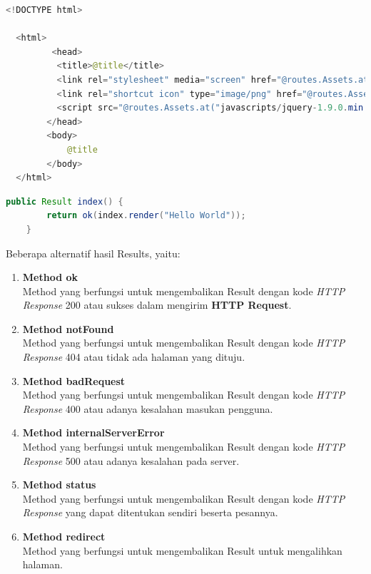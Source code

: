 \documentclass[a4paper,twoside]{article}
\begin{document}
\begin{enumerate}
\begin{lstlisting}[caption=Contoh View,label = {lst_2_view},language=Java]
  <!DOCTYPE html>

  <html>
         <head>
          <title>@title</title>
          <link rel="stylesheet" media="screen" href="@routes.Assets.at("stylesheets/main.css")">
          <link rel="shortcut icon" type="image/png" href="@routes.Assets.at("images/favicon.png")">
          <script src="@routes.Assets.at("javascripts/jquery-1.9.0.min.js")" type="text/javascript"></script>
        </head>
        <body>
            @title
        </body>
  </html>
\end{lstlisting}


\begin{lstlisting}[caption=Contoh Controller,label = {lst_2_controller},language=Java]
  public Result index() {
        return ok(index.render("Hello World"));
    }
\end{lstlisting}

Beberapa alternatif hasil Results, yaitu:
\begin{enumerate}
  \item \textbf{Method ok} \\
  Method yang berfungsi untuk mengembalikan Result dengan kode \textit{HTTP Response} 200 atau sukses dalam mengirim \textbf{HTTP Request}.
  \item \textbf{Method notFound} \\
  Method yang berfungsi untuk mengembalikan Result dengan  kode \textit{HTTP Response} 404 atau tidak ada halaman yang dituju.
  \item \textbf{Method badRequest} \\
  Method yang berfungsi untuk mengembalikan Result dengan kode \textit{HTTP Response} 400 atau adanya kesalahan masukan pengguna.
  \item \textbf{Method internalServerError}\\
  Method yang berfungsi untuk mengembalikan Result dengan kode \textit{HTTP Response} 500 atau adanya kesalahan pada server.
  \item \textbf{Method status}\\
  Method yang berfungsi untuk mengembalikan Result dengan kode \textit{HTTP Response} yang dapat ditentukan sendiri beserta pesannya.
  \item \textbf{Method redirect}\\
  Method yang berfungsi untuk mengembalikan Result untuk mengalihkan halaman.
\end{enumerate}


\end{enumerate}
\end{document}
